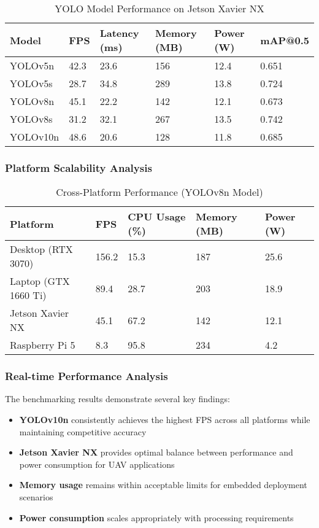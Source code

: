 \documentclass[12pt,a4paper]{article}
\begin{document}
\begin{table}[H]
\centering
\caption{YOLO Model Performance on Jetson Xavier NX}
\begin{tabular}{@{}llllll@{}}
\toprule
\textbf{Model} & \textbf{FPS} & \textbf{Latency (ms)} & \textbf{Memory (MB)} & \textbf{Power (W)} & \textbf{mAP@0.5} \\
\midrule
YOLOv5n & 42.3 & 23.6 & 156 & 12.4 & 0.651 \\
YOLOv5s & 28.7 & 34.8 & 289 & 13.8 & 0.724 \\
YOLOv8n & 45.1 & 22.2 & 142 & 12.1 & 0.673 \\
YOLOv8s & 31.2 & 32.1 & 267 & 13.5 & 0.742 \\
YOLOv10n & 48.6 & 20.6 & 128 & 11.8 & 0.685 \\
\bottomrule
\end{tabular}
\end{table}

\subsubsection{Platform Scalability Analysis}

\begin{table}[H]
\centering
\caption{Cross-Platform Performance (YOLOv8n Model)}
\begin{tabular}{@{}lllll@{}}
\toprule
\textbf{Platform} & \textbf{FPS} & \textbf{CPU Usage (\%)} & \textbf{Memory (MB)} & \textbf{Power (W)} \\
\midrule
Desktop (RTX 3070) & 156.2 & 15.3 & 187 & 25.6 \\
Laptop (GTX 1660 Ti) & 89.4 & 28.7 & 203 & 18.9 \\
Jetson Xavier NX & 45.1 & 67.2 & 142 & 12.1 \\
Raspberry Pi 5 & 8.3 & 95.8 & 234 & 4.2 \\
\bottomrule
\end{tabular}
\end{table}

\subsubsection{Real-time Performance Analysis}

The benchmarking results demonstrate several key findings:

\begin{itemize}
    \item \textbf{YOLOv10n} consistently achieves the highest FPS across all platforms while maintaining competitive accuracy
    \item \textbf{Jetson Xavier NX} provides optimal balance between performance and power consumption for UAV applications
    \item \textbf{Memory usage} remains within acceptable limits for embedded deployment scenarios
    \item \textbf{Power consumption} scales appropriately with processing requirements
\end{itemize}
\end{document}
